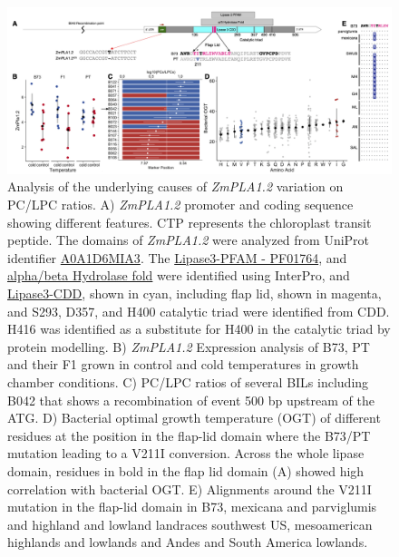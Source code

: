 \documentclass[9pt,twocolumn,twoside,lineno]{BioRxiv}
\begin{document}
\begin{figure}[ht]
\begin{center}
\includegraphics[width=0.8\paperwidth]{Figures/Fig_4.png}
\caption{Analysis of the underlying causes of \textit{ZmPLA1.2} variation on PC/LPC ratios.    
A) \textit{ZmPLA1.2} promoter and coding sequence showing different features. CTP represents the chloroplast transit peptide. The domains of \textit{ZmPLA1.2} were analyzed from UniProt identifier \hyperlink{https://www.uniprot.org/uniprot/A0A1D6MIA3}{A0A1D6MIA3}. The \hyperlink{https://www.ebi.ac.uk/interpro/entry/pfam/PF01764/}{Lipase3-PFAM - PF01764}, and \hyperlink{https://www.ebi.ac.uk/interpro/entry/InterPro/IPR029058/}{alpha/beta Hydrolase fold} were identified using InterPro, and \hyperlink{https://www.ncbi.nlm.nih.gov/Structure/cdd/cddsrv.cgi?uid=cd00519}{Lipase3-CDD}, shown in cyan, including flap lid, shown in magenta, and S293, D357, and H400 catalytic triad were identified from CDD. H416 was identified as a substitute for H400 in the catalytic triad by protein modelling.
B) \textit{ZmPLA1.2} Expression analysis of B73, PT and their F1 grown in control and cold temperatures in growth chamber conditions. 
C) PC/LPC ratios of several BILs including B042 that shows a recombination of event 500 bp upstream of the ATG.
D) Bacterial optimal growth temperature (OGT) of different residues at the position in the flap-lid domain where the B73/PT mutation leading to a V211I conversion. Across the whole lipase domain, residues in bold in the flap lid domain (A) showed high correlation with bacterial OGT. 
E) Alignments around the V211I mutation in the flap-lid domain in B73, mexicana and parviglumis and highland and lowland landraces southwest US, mesoamerican highlands and lowlands and Andes and South America lowlands.} 
\label{Fig4}
\end{center}
\end{figure} 
\end{document}
